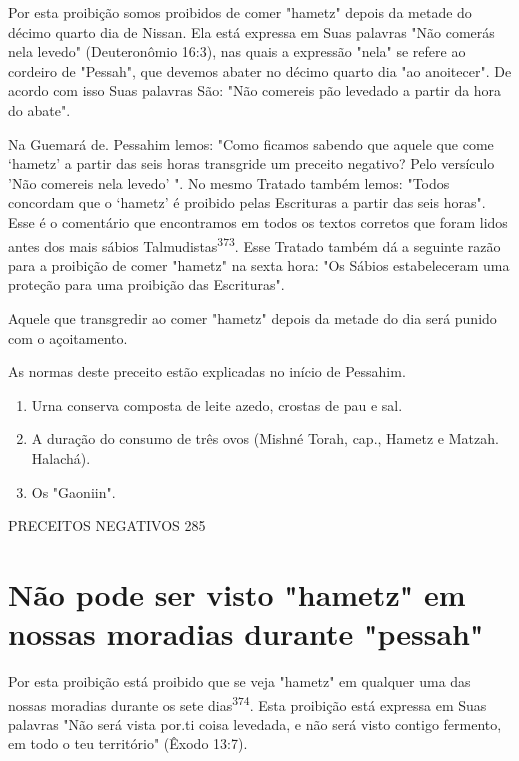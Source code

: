 \begin{itemize}
\begin{enumrate}
\begin{itemize}
\begin{itemize}
\begin{itemize}
Por esta proibição somos proibidos de comer "hametz" depois da metade do
décimo quarto dia de Nissan. Ela está expressa em Suas palavras "Não
comerás nela levedo" (Deuteronômio 16:3), nas quais a expressão "nela"
se refere ao cordeiro de "Pessah", que devemos abater no décimo quarto
dia "ao anoitecer". De acordo com isso Suas palavras São: "Não comereis
pão leveda­do a partir da hora do abate".

Na Guemará de. Pessahim lemos: "Como ficamos sabendo que aque­le que
come `hametz' a partir das seis horas transgride um preceito negativo?
Pelo versículo 'Não comereis nela levedo' ". No mesmo Tratado também
le­mos: "Todos concordam que o `hametz' é proibido pelas Escrituras a
partir das seis horas". Esse é o comentário que encontramos em todos os
textos corretos que foram lidos antes dos mais sábios
Talmudistas\textsuperscript{373}. Esse Tratado também dá a seguinte
razão para a proibição de comer "hametz" na sexta hora: "Os Sábios
estabeleceram uma proteção para uma proibição das Escrituras".

Aquele que transgredir ao comer "hametz" depois da metade do dia será
punido com o açoitamento.


As normas deste preceito estão explicadas no início de Pessahim.

\begin{enumerate}
\def\labelenumi{\arabic{enumi}.}
\setcounter{enumi}{370}
\item
 
 Urna conserva composta de leite azedo, crostas de pau e sal.
 
\item
 
 A duração do consumo de três ovos (Mishné Torah, cap., Hametz e
 Matzah. Halachá).
 
\item
 
 Os "Gaoniin".
 
\end{enumerate}


PRECEITOS NEGATIVOS 285

\section{Não pode ser visto "hametz" em nossas moradias durante "pessah"}

Por esta proibição está proibido que se veja "hametz" em qualquer uma
das nossas moradias durante os sete dias\textsuperscript{374}. Esta
proibição está expressa em Suas palavras "Não será vista por.ti coisa
levedada, e não será visto contigo fermento, em todo o teu território"
(Êxodo 13:7).


\end{itemize}
\end{itemize}
\end{itemize}
\end{enumrate}
\end{itemize}
